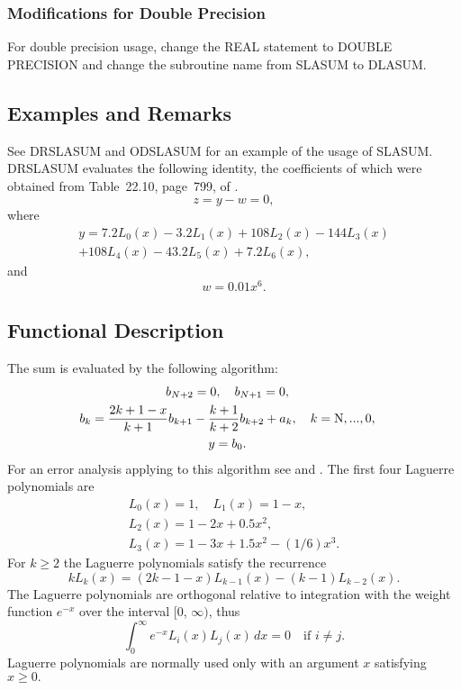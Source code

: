 \documentclass[twoside]{MATH77}
\begin{document}
\subsubsection{Modifications for Double Precision}

For double precision usage, change the REAL statement to DOUBLE PRECISION
and change the subroutine name from SLASUM to DLASUM.

\subsection{Examples and Remarks}

See DRSLASUM and ODSLASUM for an example of the usage of SLASUM. DRSLASUM
evaluates the following identity, the coefficients of which were obtained
from Table~22.10, page~799, of \cite{ams55:or-poly}.
\begin{equation*}
z=y-w=0,
\end{equation*}
where
\begin{multline*}
y = 7.2L_0(x)-3.2L_1(x)+108L_2(x)-144L_3(x)\\
+108L_4(x)-43.2L_5(x)+7.2L_6(x),
\end{multline*}
and
\begin{equation*}
w=0.01x^6.
\end{equation*}

\subsection{Functional Description}

The sum is evaluated by the following algorithm:%
\begin{gather*}
\hspace{-10pt}b_{N+2}=0,\quad b_{N+1}=0, \\
\hspace{-10pt}b_k=\frac{2k+1-x}{k+1}b_{k+1}-\frac{k+1}{k+2}b_{k+2}+a_k,
\quad k=\text{N},...,0,\\
\hspace{-10pt}y=b_0.
\end{gather*}
For an error analysis applying to this algorithm see \cite{Ng:1968:DSS} and
\cite{Ng:1971:RAC}. The first four Laguerre polynomials are
\begin{gather*}
L_0(x)=1,\quad L_1(x)=1-x,\\
L_2(x)=1-2x+0.5x^2,\\
L_3(x)=1-3x+1.5x^2-(1/6)x^3.
\end{gather*}
For $k \geq 2$ the Laguerre polynomials satisfy the recurrence
\begin{equation*}
kL_k(x)=(2k-1-x)L_{k-1}(x)-(k-1)L_{k-2}(x).
\end{equation*}
The Laguerre polynomials are orthogonal relative to integration with the
weight function $e^{-x}$ over the interval [0, $\infty )$, thus%
\begin{equation*}
\int_0^\infty e^{-x}L_i(x)L_j(x)\,dx=0\quad \text{if }i\neq j.
\end{equation*}
Laguerre polynomials are normally used only with an argument $x$ satisfying $%
x \geq 0.$
\end{document}
